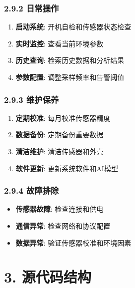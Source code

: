\subsubsection{2.9.2 日常操作}\label{ux65e5ux5e38ux64cdux4f5c}

\begin{enumerate}
\def\labelenumi{\arabic{enumi}.}
\tightlist
\item
  \textbf{启动系统}: 开机自检和传感器状态检查
\item
  \textbf{实时监控}: 查看当前环境参数
\item
  \textbf{历史查询}: 检索历史数据和分析结果
\item
  \textbf{参数配置}: 调整采样频率和告警阈值
\end{enumerate}

\subsubsection{2.9.3 维护保养}\label{ux7ef4ux62a4ux4fddux517b}

\begin{enumerate}
\def\labelenumi{\arabic{enumi}.}
\tightlist
\item
  \textbf{定期校准}: 每月校准传感器精度
\item
  \textbf{数据备份}: 定期备份重要数据
\item
  \textbf{清洁维护}: 清洁传感器和外壳
\item
  \textbf{软件更新}: 更新系统软件和AI模型
\end{enumerate}

\subsubsection{2.9.4 故障排除}\label{ux6545ux969cux6392ux9664}

\begin{itemize}
\tightlist
\item
  \textbf{传感器故障}: 检查连接和供电
\item
  \textbf{通信异常}: 检查网络和协议配置
\item
  \textbf{数据异常}: 验证传感器校准和环境因素
\end{itemize}

\section{3. 源代码结构}\label{ux6e90ux4ee3ux7801ux7ed3ux6784}

